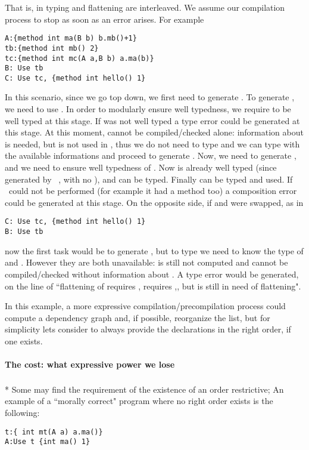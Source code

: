 That is, in \name typing and flattening are interleaved. We assume our compilation process to stop as soon as 
an error arises. 
For example
\saveSpace\begin{lstlisting}
A:{method int ma(B b) b.mb()+1}
tb:{method int mb() 2}
tc:{method int mc(A a,B b) a.ma(b)}
B: Use tb
C: Use tc, {method int hello() 1}
\end{lstlisting}\saveSpace
In this scenario, since we go top down, we first need to generate \Q@B@.
To generate \Q@B@, we need to use \Q@tb@.
In order to modularly ensure well typedness,
we require \Q@tb@ to be well typed at this stage. If \Q@tb@ was not well typed
a type error could be generated at this stage.
At this moment, \Q@A@ cannot be compiled/checked alone:
information about \Q@B@ is needed, but \Q@A@ is not used in \Q@tb@,
thus we do not need to type \Q@A@ and we can type \Q@tb@ with
 the available informations and proceed to generate \Q@B@.
Now, we need to generate \Q@C@, and we need to ensure well typedness of \Q@tc@.
Now \Q@B@ is already well typed (since generated by \use\ \Q@tb@, with no \mL),
and \Q@A@ can be typed. Finally \Q@tc@ can be typed and used.
If \use\ could not be performed (for example it \Q@tc@ had a method \Q@hello@ too)
a composition error could be generated at this stage.
On the opposite side, if \Q@B@ and \Q@C@ were swapped, as in
\saveSpace\begin{lstlisting}
C: Use tc, {method int hello() 1}  
B: Use tb
\end{lstlisting}\saveSpace
\noindent
now the first task would be to generate \Q@C@, but 
to type \Q@tc@ we need to know the type of \Q@A@ and \Q@B@.
However they are both unavailable: \Q@B@ is still not computed and 
\Q@A@ cannot be compiled/checked without information about \Q@B@.
A type error would be generated, on the line of ``flattening of \Q@C@
requires \Q@tc@, \Q@tc@ requires \Q@A@,\Q@B@, but \Q@B@ is still in need of flattening".

In this example, a more expressive compilation/precompilation process 
could compute a dependency graph and, if possible, reorganize the list,
but for simplicity lets consider to always provide the declarations
in the right order, if one exists.

\paragraph{The cost: what expressive power we lose}${}_{}$\\*
Some may find the requirement of the existence of an order restrictive;
An example of a ``morally correct" program where no right order exists is the following:
\saveSpace\begin{lstlisting}
t:{ int mt(A a) a.ma()}
A:Use t {int ma() 1}
\end{lstlisting}\saveSpace


